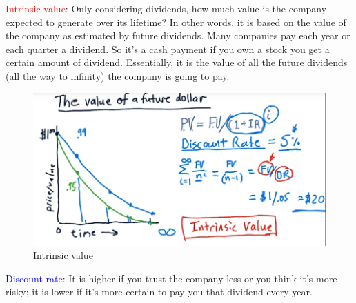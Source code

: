 \documentclass[12pt]{article}
\begin{document}
\textcolor{red}{Intrinsic value}: Only considering dividends, how much value is the company expected to generate over its lifetime? In other words, it is based on the value of the company as estimated by future dividends. Many companies pay each year or each quarter a dividend. So it's a cash payment if you own a stock you get a certain amount of dividend. Essentially, it is the value of all the future dividends (all the way to infinity) the company is going to pay.

\begin{figure}[!ht]
\centering
\includegraphics[scale=0.4]{fig/fig35}
\caption{Intrinsic value}
\end{figure}

\textcolor{blue}{Discount rate}: It is higher if you trust the company less or you think it's more risky; it is lower if it's more certain to pay you that dividend every year. 
\end{document}
